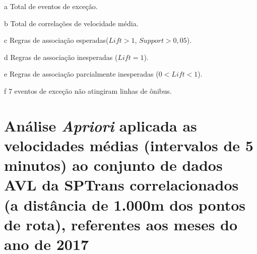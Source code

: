\documentclass[
	12pt,				%
	oneside,			%
	a4paper,			%
	english,			%
	brazil				%
	]{abntex2ppgsi}
\begin{document}
{{\begin{apendicesenv}
\begin{table}[!htb]
\begin{threeparttable}
\begin{tablenotes}
            \item[a] Total de eventos de exceção.
            \item[b] Total de correlações de velocidade média.
            \item[c] Regras de associação esperadas($Lift > 1$, $Support > 0,05$).
            \item[d] Regras de associação inesperadas ($Lift = 1$).
            \item[e] Regras de associação parcialmente inesperadas ($0 < Lift < 1$).
            \item[f] 7 eventos de exceção não atingiram linhas de ônibus.
        \end{tablenotes}
\end{threeparttable}
\end{table}

\clearpage

\section{Análise \textit{Apriori} aplicada as velocidades médias (intervalos de 5 minutos) ao conjunto de dados AVL da SPTrans correlacionados (a distância de 1.000m dos pontos de rota), referentes aos meses do ano de 2017}
\label{g4}



\end{apendicesenv}}}
\end{document}
